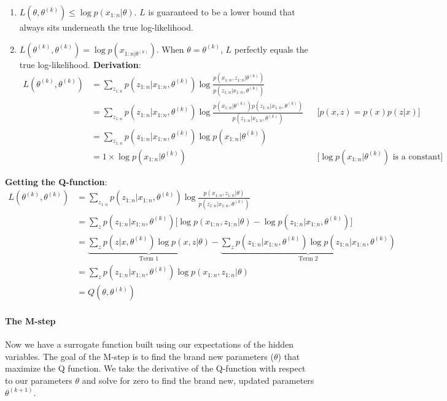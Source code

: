 \documentclass[../Probability.tex]{subfiles}
\begin{document}
\begin{enumerate}
    \item $L(\theta, \theta^{(k)}) \le \log p(x_{1:n}|\theta)$. $L$ is guaranteed to be a lower bound that always sits underneath the true log-likelihood.
    \item $L(\theta^{(k)},\theta^{(k)}) = \log p(x_{1:n|\theta^{(k)}})$. When $\theta = \theta^{(k)}$, $L$ perfectly equals the true log-likelihood.\newline
    \textbf{Derivation}: \begin{align*}
        L(\theta^{(k)}, \theta^{(k)}) &= \sum_{z_{1:n}} p(z_{1:n}|x_{1:n}, \theta^{(k)}) \log \frac{p(x_{1:n}, z_{1:n}|\theta^{(k)})}{p(z_{1:n}|x_{1:n}, \theta^{(k)})} \\
        &= \sum_{z_{1:n}} p(z_{1:n}|x_{1:n}, \theta^{(k)}) \log \frac{p(x_{1:n}|\theta^{(k)}) p(z_{1:n}|x_{1:n}, \theta^{(k)})}{p(z_{1:n}|x_{1:n}, \theta^{(k)})} && \text{[$p(x, z) = p(x)p(z|x)$]}\\
        &= \sum_{z_{1:n}} p(z_{1:n}|x_{1:n}, \theta^{(k)}) \log p(x_{1:n}|\theta^{(k)}) \\
        &= 1 \times \log p(x_{1:n}|\theta^{(k)}) &&\text{[$\log p(x_{1:n}|\theta^{(k)})$ is a constant]}
    \end{align*}
\end{enumerate}
\textbf{Getting the Q-function}:
\begin{align*}
    L(\theta^{(k)}, \theta^{(k)}) &= \sum_{\textstyle z_{1:n}} p(z_{1:n}|x_{1:n}, \theta^{(k)}) \log \frac{p(x_{1:n}, z_{1:n}|\theta)}{p(z_{1:n}|x_{1:n}, \theta^{(k)})} \\
    &= \sum_z p(z_{1:n}|x_{1:n}, \theta^{(k)}) \Big[ \log p(x_{1:n}, z_{1:n}|\theta) - \log p(z_{1:n}|x_{1:n}, \theta^{(k)}) \Big] \\
    &= \underbrace{\sum_z p(z|x, \theta^{(k)}) \log p(x, z|\theta)}_{\text{Term 1}} - \underbrace{\sum_z p(z_{1:n}|x_{1:n}, \theta^{(k)}) \log p(z_{1:n}|x_{1:n}, \theta^{(k)})}_{\text{Term 2}} \\
    &= \sum_{z} p(z_{1:n}|x_{1:n}, \theta^{(k)}) \log p(x_{1:n}, z_{1:n}|\theta) \\
    &= Q(\theta, \theta^{(k)})
\end{align*}
\paragraph{The M-step} Now we have a surrogate function built using our expectations of the hidden variables.
The goal of the M-step is to find the brand new parameters ($\theta$) that maximize the Q function.
We take the derivative of the Q-function with respect to our parameters $\theta$ and solve for zero to find the brand new, updated parameters $\theta^{(k+1)}$.\newline
\end{document}
